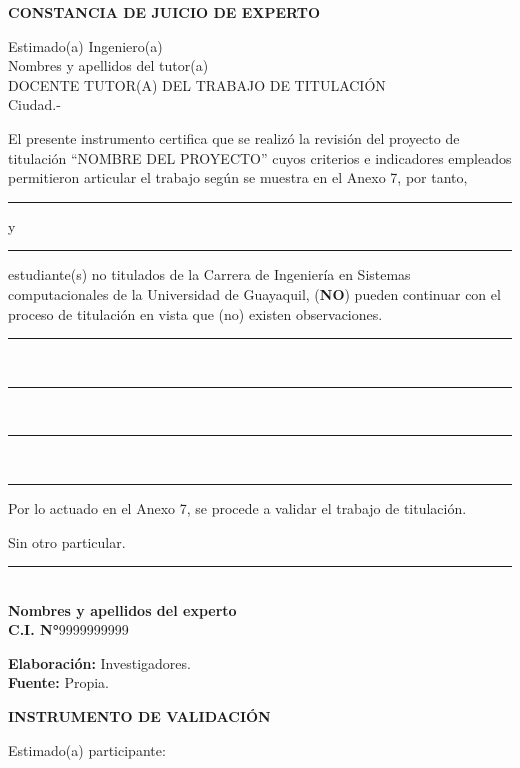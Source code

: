 \documentclass[12pt, a4paper, nofontenc, numbers=endperiod]{apa7}
\begin{document}
{\newpage
\begin{center}
	\textbf{CONSTANCIA DE JUICIO DE EXPERTO}
\end{center}
\vspace*{0.5cm}
\setlength{\parindent}{0cm}Estimado(a) Ingeniero(a)\\
Nombres y apellidos del tutor(a)\\
DOCENTE TUTOR(A) DEL TRABAJO DE TITULACIÓN\\
Ciudad.-
\vspace*{0.5cm}

\setlength{\parindent}{1.27cm}El presente instrumento certifica que se realizó la revisión del proyecto de titulación “NOMBRE DEL PROYECTO” cuyos criterios e indicadores empleados permitieron articular el trabajo según se muestra en el Anexo 7, por tanto, \rule[0mm]{60mm}{0.1mm} y 
\rule[0mm]{60mm}{0.1mm} estudiante(s) no titulados de la Carrera de Ingeniería en Sistemas computacionales de la Universidad de Guayaquil, (\textbf{NO}) pueden continuar con el proceso de titulación en vista que (no) existen observaciones.\\
\rule[0mm]{160mm}{0.1mm}\\
\rule[0mm]{160mm}{0.1mm}\\
\rule[0mm]{160mm}{0.1mm}\\
\rule[0mm]{160mm}{0.1mm}

\setlength{\parindent}{1.27cm}Por lo actuado en el Anexo 7, se procede a validar el trabajo de titulación. 

\setlength{\parindent}{0cm}Sin otro particular.
\vspace*{1cm}

\begin{center}
	\singlespacing
	\rule[0mm]{70mm}{0.1mm}\\
	\textbf{Nombres y apellidos del experto}  \\
	\textbf{C.I. N°}9999999999   
\end{center}

\vspace*{1cm}
\begin{center}
	\footnotesize
	\singlespacing\textbf{Elaboración:} Investigadores.\\
	\textbf{Fuente:} Propia.
\end{center}


\newpage
\begin{center}
	\textbf{INSTRUMENTO DE VALIDACIÓN}
\end{center}
\vspace*{-0.5cm}
{\singlespacing
	\setlength{\parindent}{0cm}  Estimado(a) participante:
	
}}
\end{document}
